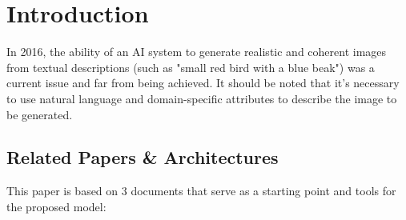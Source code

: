 
\section*{Introduction}

In 2016, the ability of an AI system to generate realistic and 
coherent images from textual descriptions 
(such as "small red bird with a blue beak") was a current issue and 
far from being achieved.
It should be noted that it's necessary to use natural language 
and domain-specific attributes to describe the image to be generated.


 \subsection*{Related Papers \& Architectures}
 This paper is based on 3 documents that serve as a starting 
 point and tools for the proposed model:
